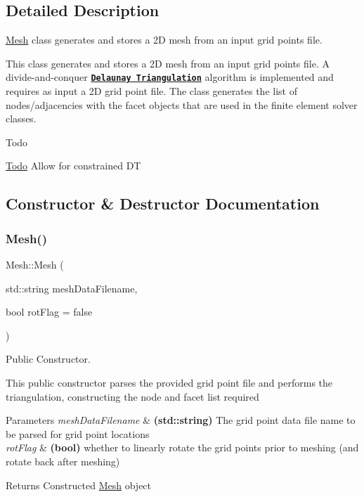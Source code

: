 \subsection{Detailed Description}
\mbox{\hyperlink{class_mesh}{Mesh}} class generates and stores a 2D mesh from an input grid points file. 

This class generates and stores a 2D mesh from an input grid points file. A divide-\/and-\/conquer {\bfseries \href{https://en.wikipedia.org/wiki/Delaunay_triangulation}{\tt Delaunay Triangulation}} algorithm is implemented and requires as input a 2D grid point file. The class generates the list of nodes/adjacencies with the facet objects that are used in the finite element solver classes. \begin{DoxyRefDesc}{Todo}
\item[\mbox{\hyperlink{todo__todo000005}{Todo}}]Allow for constrained DT \end{DoxyRefDesc}


\subsection{Constructor \& Destructor Documentation}
\mbox{\label{class_mesh_ade26657ad48e8e84af8a2614a8ac6b0c}} 
\subsubsection{\texorpdfstring{Mesh()}{Mesh()}}
{\footnotesize\ttfamily Mesh\+::\+Mesh (\begin{DoxyParamCaption}\item[{std\+::string}]{mesh\+Data\+Filename,  }\item[{bool}]{rot\+Flag = {\ttfamily false} }\end{DoxyParamCaption})}



Public Constructor. 

This public constructor parses the provided grid point file and performs the triangulation, constructing the node and facet list required 
\begin{DoxyParams}{Parameters}
{\em mesh\+Data\+Filename} & {\bfseries (std\+::string)} The grid point data file name to be parsed for grid point locations \\
\hline
{\em rot\+Flag} & {\bfseries (bool)} whether to linearly rotate the grid points prior to meshing (and rotate back after meshing) \\
\hline
\end{DoxyParams}
\begin{DoxyReturn}{Returns}
Constructed \mbox{\hyperlink{class_mesh}{Mesh}} object 
\end{DoxyReturn}
\mbox{\label{class_mesh_a5efe4da1a4c0971cfb037bd70304c303}} 
